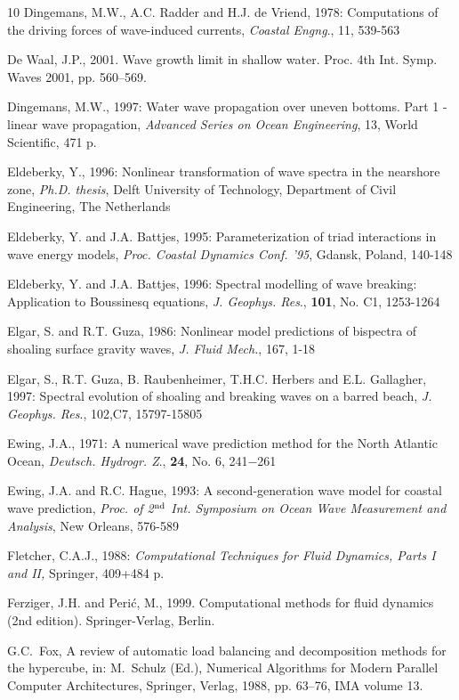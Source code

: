 \documentclass[12pt]{book}
\begin{document}
\begin{thebibliography}{10}
Dingemans, M.W., A.C. Radder and H.J. de Vriend, 1978: Computations of the driving forces of wave-induced
currents, {\it Coastal Engng}., 11, 539-563

{De Waal}, J.P., 2001. Wave growth limit in shallow water. Proc. 4th Int. Symp. Waves 2001, pp. 560--569.

Dingemans, M.W., 1997: Water wave propagation over uneven bottoms. Part 1 -linear wave propagation,
{\it Advanced Series on Ocean Engineering}, 13, World Scientific, 471 p.

Eldeberky, Y., 1996: Nonlinear transformation of wave spectra in the nearshore zone, {\it Ph.D. thesis}, Delft
University of Technology, Department of Civil Engineering, The Netherlands

Eldeberky, Y. and J.A. Battjes, 1995: Parameterization of triad interactions in wave energy models, {\it Proc.
Coastal Dynamics Conf. '95}, Gdansk, Poland, 140-148

Eldeberky, Y. and J.A. Battjes, 1996: Spectral modelling of wave breaking: Application to Boussinesq
equations, {\it J. Geophys. Res}., {\bf 101}, No. C1, 1253-1264

Elgar, S. and R.T. Guza, 1986: Nonlinear model predictions of bispectra of shoaling surface gravity waves,
{\it J. Fluid Mech.}, 167, 1-18

Elgar, S., R.T. Guza, B. Raubenheimer, T.H.C. Herbers and E.L. Gallagher, 1997: Spectral evolution of
shoaling and breaking waves on a barred beach, {\it J. Geophys. Res}., 102,C7, 15797-15805

Ewing, J.A., 1971: A numerical wave prediction method for the North Atlantic Ocean, {\it Deutsch. Hydrogr. Z}.,
{\bf 24}, No. 6, 241$-$261

Ewing, J.A. and R.C. Hague, 1993: A second-generation wave model for coastal wave prediction, {\it Proc.
of 2$^{{\rm nd}}$ Int. Symposium on Ocean Wave Measurement and Analysis}, New Orleans, 576-589

Fletcher, C.A.J., 1988: {\it Computational Techniques for Fluid Dynamics, Parts I and II,} Springer, 409+484
p.

Ferziger, J.H. and Peri\'{c}, M., 1999. Computational methods for fluid dynamics (2nd edition).
  Springer-Verlag, Berlin.

G.C.~Fox, A review of automatic load balancing and decomposition methods for the
  hypercube, in: M.~Schulz (Ed.), Numerical Algorithms for Modern Parallel
  Computer Architectures, Springer, Verlag, 1988, pp. 63--76, IMA volume 13.


\end{thebibliography}
\end{document}
